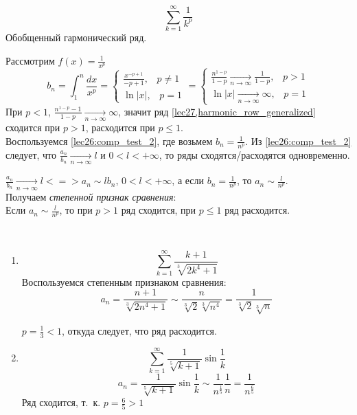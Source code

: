 \documentclass[../../main.tex]{subfiles}
\begin{document}
	\begin{iex}
		
		\begin{equation}  \sum_{k = 1}^{\infty} \frac{1}{k^p}  
		\label{lec27,harmonic_row_generalized}  \end{equation}
		Обобщенный гармонический ряд.
		
		Рассмотрим $f(x) = \frac{1}{x^p}$
		\[ b_n = \int_{1}^{n} \frac{dx}{x^p} = \begin{cases} \frac{x^{-p + 1}}{-p + 
		1} , \; \;\; p \ne 1  \\  \ln{|x|}, \; \; \; p = 1 \end{cases} =  
		\begin{cases} \frac{n^{1-p}}{1-p } \underset{n \rightarrow \infty}
		{\longrightarrow} \frac{1}{1-p} , \; \;\; p > 1  \\  \ln{|x|} \underset{n 
		\rightarrow \infty}
		{\longrightarrow} \infty , \; \; \; p = 1 \end{cases} \]
		При $p < 1$, $\frac{n^{1-p} - 1}{1-p} \underset{n \rightarrow \infty}
		{\longrightarrow} \infty $, значит ряд \ref{lec27,harmonic_row_generalized} 
		сходится при $p>1$, расходится при $p \le 1$.\\
		Воспользуемся \ref{lec26:comp_test_2}, где возьмем $b_n = \frac{1}{n^p}$. Из 
		\ref{lec26:comp_test_2} следует, что  $\frac{a_n}{b_n} \underset{n 
		\rightarrow \infty} {\longrightarrow} l $ и $0 < l < +\infty$, то ряды 
		сходятся/расходятся одновременно.
		
		$\frac{a_n}{b_n} \underset{n \rightarrow \infty} {\longrightarrow} l <=> a_n 
		\sim l b_n$, $0 < l < +\infty$, а если $b_n = \frac{1}{n^p}$, то $a_n \sim 
		\frac{l}{n^p}$.\\	
		Получаем \emph{степенной признак сравнения}:\\		
		Если $a_n \sim \frac{l}{n^p}$, то при $p>1$ ряд сходится, при $p \le 1$ ряд 
		расходится.
	\end{iex}	

	\begin{examples}
		~
	\begin{enumerate}[label=\arabic*)]	
		\item \[ \sum_{k = 1}^{\infty} \frac{k+1}{\sqrt[3]{2k^4 + 1}}  \]
		Воспользуемся степенным признаком сравнения:
		\[ a_n = \frac{n+1}{\sqrt[3]{2n^4 + 1}} \sim \frac{n}{\sqrt[3]{2} 
		\sqrt[3]{n^4}} = \frac{1}{\sqrt[3]{2} \sqrt[3]{n}}          \]
		
		$p = \frac{1}{3} < 1$, откуда следует, что ряд расходится. 
		\item \[ \sum_{k=1}^{\infty} \frac{1}{\sqrt[5]{k+1}} \sin{\frac{1}{k}}  \]
		\[  a_n =  \frac{1}{\sqrt[5]{k+1}} \sin{\frac{1}{k}} \sim 
		\frac{1}{n^{\frac{1}{5}} }  \frac{1}{n} =  \frac{1}{n^{\frac{6}{5}} }        
		\]
		Ряд сходится, т.~к. $p = \frac{6}{5} > 1$
	\end{enumerate}	
	\end{examples}	
\end{document}
